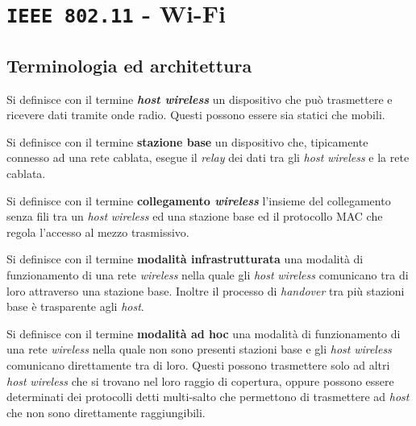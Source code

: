 \section[\texttt{IEE 802.11} - \texttt{Wi-Fi}]{\texttt{\Acrshort*{IEEE} 802.11} - \Acrshort*{Wi-Fi}}
    \subsection{Terminologia ed architettura}
        \begin{definition}
            Si definisce con il termine \textbf{\textit{host wireless}} un dispositivo che può trasmettere e ricevere dati tramite onde radio. Questi possono essere sia statici che mobili.
        \end{definition}
        \begin{definition}
            Si definisce con il termine \textbf{stazione base} un dispositivo che, tipicamente connesso ad una rete cablata, esegue il \textit{relay} dei dati tra gli \textit{host} \textit{wireless} e la rete cablata.
        \end{definition}
        \begin{definition}
            Si definisce con il termine \textbf{collegamento \textit{wireless}} l'insieme del collegamento senza fili tra un \textit{host} \textit{wireless} ed una stazione base ed il protocollo \Acrshort*{MAC} che regola l'accesso al mezzo trasmissivo.
        \end{definition}
        \begin{definition}
            Si definisce con il termine \textbf{modalità infrastrutturata} una modalità di funzionamento di una rete \textit{wireless} nella quale gli \textit{host} \textit{wireless} comunicano tra di loro attraverso una stazione base. Inoltre il processo di \textit{handover} tra più stazioni base è trasparente agli \textit{host}.
        \end{definition}
        \begin{definition}
            Si definisce con il termine \textbf{modalità ad hoc} una modalità di funzionamento di una rete \textit{wireless} nella quale non sono presenti stazioni base e gli \textit{host} \textit{wireless} comunicano direttamente tra di loro. Questi possono trasmettere solo ad altri \textit{host} \textit{wireless} che si trovano nel loro raggio di copertura, oppure possono essere determinati dei protocolli detti multi-salto che permettono di trasmettere ad \textit{host} che non sono direttamente raggiungibili.
        \end{definition}
